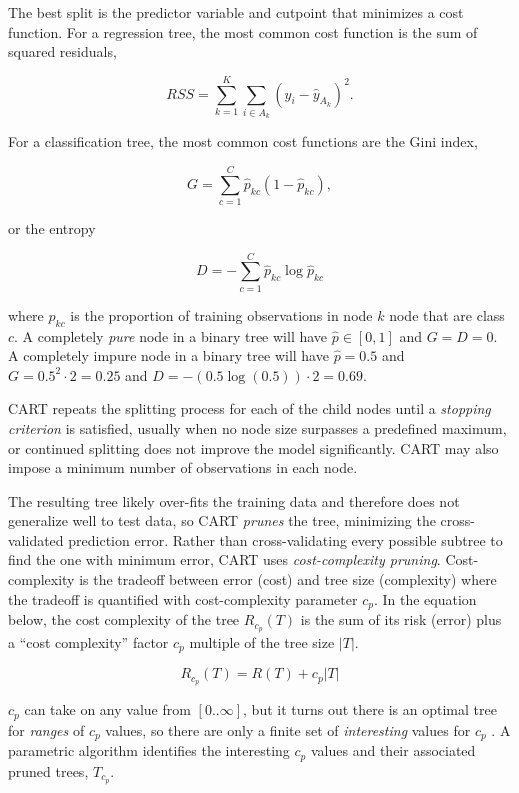 \documentclass[]{book}
\begin{document}
The best split is the predictor variable and cutpoint that minimizes a cost function. For a regression tree, the most common cost function is the sum of squared residuals,

\[RSS = \sum_{k=1}^K\sum_{i \in A_k}{\left(y_i - \hat{y}_{A_k} \right)^2}.\]

For a classification tree, the most common cost functions are the Gini index,

\[G = \sum_{c=1}^C{\hat{p}_{kc}(1 - \hat{p}_{kc})},\]

or the entropy

\[D = - \sum_{c=1}^C{\hat{p}_{kc} \log \hat{p}_{kc}}\]

where \(\hat{p}_{kc}\) is the proportion of training observations in node \(k\) node that are class \(c\). A completely \emph{pure} node in a binary tree will have \(\hat{p} \in [0, 1]\) and \(G = D = 0\). A completely impure node in a binary tree will have \(\hat{p} = 0.5\) and \(G = 0.5^2 \cdot 2 = 0.25\) and \(D = -(0.5 \log(0.5)) \cdot 2 = 0.69\).

CART repeats the splitting process for each of the child nodes until a \emph{stopping criterion} is satisfied, usually when no node size surpasses a predefined maximum, or continued splitting does not improve the model significantly. CART may also impose a minimum number of observations in each node.

The resulting tree likely over-fits the training data and therefore does not generalize well to test data, so CART \emph{prunes} the tree, minimizing the cross-validated prediction error. Rather than cross-validating every possible subtree to find the one with minimum error, CART uses \emph{cost-complexity pruning}. Cost-complexity is the tradeoff between error (cost) and tree size (complexity) where the tradeoff is quantified with cost-complexity parameter \(c_p\). In the equation below, the cost complexity of the tree \(R_{c_p}(T)\) is the sum of its risk (error) plus a ``cost complexity'' factor \(c_p\) multiple of the tree size \(|T|\).

\[R_{c_p}(T) = R(T) + c_p|T|\]

\(c_p\) can take on any value from \([0..\infty]\), but it turns out there is an optimal tree for \emph{ranges} of \(c_p\) values, so there are only a finite set of \emph{interesting} values for \(c_p\) \citep{James2013} \citep{Therneau2019} \citep{Kuhn2016}. A parametric algorithm identifies the interesting \(c_p\) values and their associated pruned trees, \(T_{c_p}\).
\end{document}
